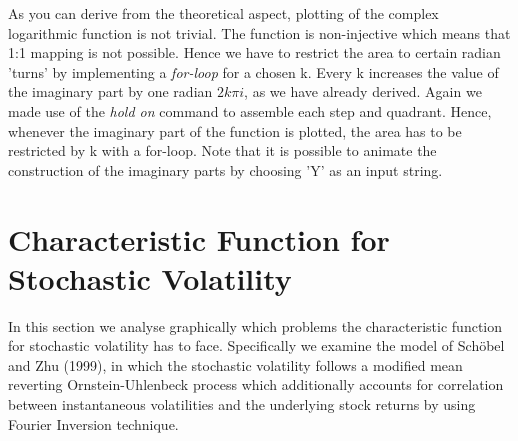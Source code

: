 \documentclass[a4paper,11pt]{article}
\begin{document}
As you can derive from the theoretical aspect, plotting of the complex logarithmic function is not trivial. The function is non-injective which means that 1:1 mapping is not possible. Hence we have to restrict the area to certain radian 'turns' by implementing a \textit{for-loop} for a chosen k. Every k increases the value of the imaginary part by one radian $2k\pi i$, as we have already derived. Again we made use of the \textit{hold on} command to assemble each step and quadrant. Hence, whenever the imaginary part of the function is plotted, the area has to be restricted by k with a for-loop. Note that it is possible to animate the construction of the imaginary parts by choosing 'Y' as an input string.
\section{Characteristic Function for Stochastic Volatility}
In this section we analyse graphically which problems the characteristic function for stochastic volatility has to face. Specifically we examine the model of Sch\"obel and Zhu (1999), in which the stochastic volatility follows a modified mean reverting Ornstein-Uhlenbeck process which additionally accounts for correlation between instantaneous volatilities and the underlying stock returns by using Fourier Inversion technique.
\end{document}
